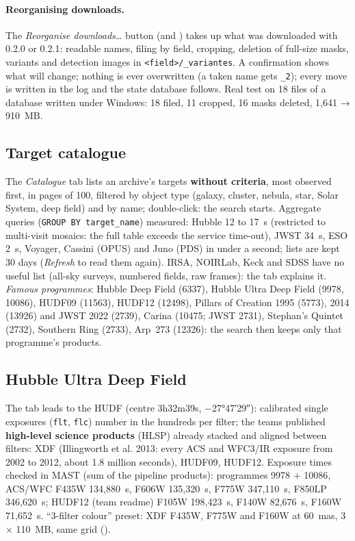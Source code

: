 \paragraph{Reorganising downloads.} The \emph{Reorganise downloads…} button (and )
takes up what was downloaded with 0.2.0 or 0.2.1: readable names, filing by field, cropping, deletion of full-size
masks, variants and detection images in \texttt{<field>/\_variantes}. A confirmation shows what will change; nothing
is ever overwritten (a taken name gets \texttt{\_2}); every move is written in the log and the state database follows.
Real test on 18 files of a database written under Windows: 18 filed, 11 cropped, 16 masks deleted, 1,641 → 910~MB.

\subsection{Target catalogue}
The \emph{Catalogue} tab lists an archive's targets \textbf{without criteria}, most observed first, in pages of 100,
filtered by object type (galaxy, cluster, nebula, star, Solar System, deep field) and by name; double-click: the search
starts. Aggregate queries (\texttt{GROUP BY target\_name}) measured: Hubble 12 to 17~s (restricted to multi-visit
mosaics: the full table exceeds the service time-out), JWST 34~s, ESO 2~s, Voyager, Cassini (OPUS) and Juno (PDS) in
under a second; lists are kept 30 days (\emph{Refresh} to read them again). IRSA, NOIRLab, Keck and SDSS have no useful
list (all-sky surveys, numbered fields, raw frames): the tab explains it. \emph{Famous programmes}: Hubble Deep Field
(6337), Hubble Ultra Deep Field (9978, 10086), HUDF09 (11563), HUDF12 (12498), Pillars of Creation 1995 (5773), 2014
(13926) and JWST 2022 (2739), Carina (10475; JWST 2731), Stephan's Quintet (2732), Southern Ring (2733), Arp~273
(12326): the search then keeps only that programme's products.

\subsection{Hubble Ultra Deep Field}
The tab leads to the HUDF (centre 3h32m39s, −27°47′29″): calibrated single exposures (\texttt{flt}, \texttt{flc})
number in the hundreds per filter; the teams published \textbf{high-level science products} (HLSP) already stacked and
aligned between filters: XDF (Illingworth et al. 2013: every ACS and WFC3/IR exposure from 2002 to 2012, about 1.8
million seconds), HUDF09, HUDF12. Exposure times checked in MAST (sum of the pipeline products): programmes 9978 +
10086, ACS/WFC F435W 134,880~s, F606W 135,320~s, F775W 347,110~s, F850LP 346,620~s; HUDF12 (team readme) F105W
198,423~s, F140W 82,676~s, F160W 71,652~s. ``3-filter colour'' preset: XDF F435W, F775W and F160W at 60~mas, 3 ×
110~MB, same grid ().

